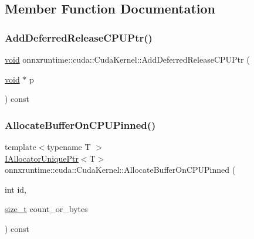 \subsection{Member Function Documentation}
\mbox{\label{classonnxruntime_1_1cuda_1_1CudaKernel_a408371d09df4c116a8076ec40260d202}} 
\subsubsection{\texorpdfstring{Add\+Deferred\+Release\+C\+P\+U\+Ptr()}{AddDeferredReleaseCPUPtr()}}
{\footnotesize\ttfamily \mbox{\hyperlink{mlasi_8h_a88f941d423cb2a819b70a1358982b1a6}{void}} onnxruntime\+::cuda\+::\+Cuda\+Kernel\+::\+Add\+Deferred\+Release\+C\+P\+U\+Ptr (\begin{DoxyParamCaption}\item[{\mbox{\hyperlink{mlasi_8h_a88f941d423cb2a819b70a1358982b1a6}{void}} $\ast$}]{p }\end{DoxyParamCaption}) const\hspace{0.3cm}{\ttfamily [inline]}}

\mbox{\label{classonnxruntime_1_1cuda_1_1CudaKernel_aa44b8fb4000256df5b257da1356d25f9}} 
\subsubsection{\texorpdfstring{Allocate\+Buffer\+On\+C\+P\+U\+Pinned()}{AllocateBufferOnCPUPinned()}}
{\footnotesize\ttfamily template$<$typename T $>$ \\
\mbox{\hyperlink{namespaceonnxruntime_a323aace024f171700e4b07b299a178e7}{I\+Allocator\+Unique\+Ptr}}$<$T$>$ onnxruntime\+::cuda\+::\+Cuda\+Kernel\+::\+Allocate\+Buffer\+On\+C\+P\+U\+Pinned (\begin{DoxyParamCaption}\item[{int}]{id,  }\item[{\mbox{\hyperlink{mlasi_8h_a503efbc1c6e50825320ad909366b78ab}{size\+\_\+t}}}]{count\+\_\+or\+\_\+bytes }\end{DoxyParamCaption}) const\hspace{0.3cm}{\ttfamily [inline]}}


